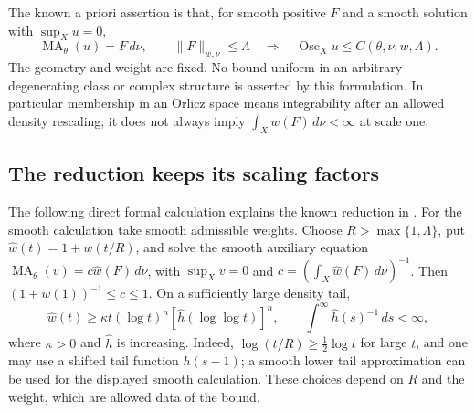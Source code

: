 The known a priori assertion is that, for smooth positive $F$ and a
smooth solution with $\sup_Xu=0$,
\[
\tag{68.23z}\label{eq:ytd-orlicz-oscillation}
 \operatorname{MA}_\theta(u)=F\,d\nu,\qquad
 \|F\|_{w,\nu}\leq\Lambda
 \quad\Longrightarrow\quad
 \operatorname{Osc}_Xu\leq C(\theta,\nu,w,\Lambda).
\]
The geometry and weight are fixed. No bound uniform in an arbitrary
degenerating class or complex structure is asserted by this formulation.
In particular membership in an Orlicz space means integrability after
an allowed density rescaling; it does not always imply
$\int_Xw(F)\,d\nu<\infty$ at scale one.

\subsection{The reduction keeps its scaling factors}
\label{sec:ytd-orlicz-reduction}

The following direct formal calculation explains the known reduction in
\cite[Section~2.1, Steps~2--3]{GuedjLu25FromYauV2}. For the smooth
calculation take smooth admissible weights. Choose
$R>\max\{1,\Lambda\}$, put $\widehat w(t)=1+w(t/R)$, and solve
the smooth auxiliary equation
$\operatorname{MA}_\theta(v)=c\widehat w(F)\,d\nu$, with
$\sup_Xv=0$ and $c=(\int_X\widehat w(F)\,d\nu)^{-1}$.
Then
$(1+w(1))^{-1}\leq c\leq1$. On a sufficiently large density tail,
\[
 \widehat w(t)\geq
   \kappa t(\log t)^n[\widehat h(\log\log t)]^n,
 \qquad \int^{\infty}\widehat h(s)^{-1}\,ds<\infty,
\]
where $\kappa>0$ and $\widehat h$ is increasing. Indeed,
$\log(t/R)\geq\tfrac12\log t$ for large $t$, and one may use a
shifted tail function $h(s-1)$; a smooth lower tail approximation can
be used for the displayed smooth calculation. These choices depend on
$R$ and the weight, which are allowed data of the bound.

